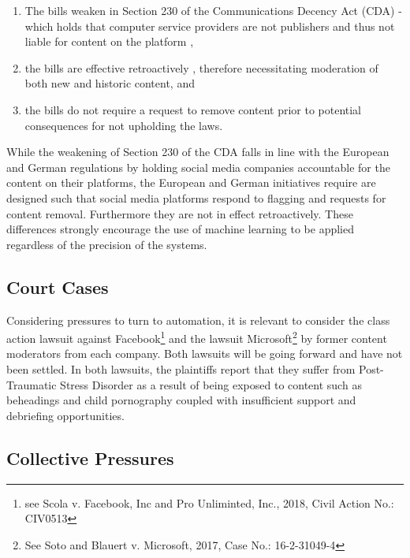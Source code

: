 \begin{enumerate}
  \item{The bills weaken \citep{Romano:2018,Stryker:2018} in Section 230 of the Communications Decency Act (CDA) - which holds that computer service providers are not publishers and thus not liable for content on the platform \citep{EFF:230},}
  \item{the bills are effective retroactively \citep{Stryker:2018}, therefore necessitating moderation of both new and historic content, and}
  \item{the bills do not require a request to remove content prior to potential consequences for not upholding the laws.}
\end{enumerate}

While the weakening of Section 230 of the CDA falls in line with the European and German regulations by holding social media companies accountable for the content on their platforms, the European and German initiatives require are designed such that social media platforms respond to flagging and requests for content removal. Furthermore they are not in effect retroactively. These differences strongly encourage the use of machine learning to be applied regardless of the precision of the systems.\vspace{5mm}

\subsection{Court Cases}  

Considering pressures to turn to automation, it is relevant to consider the class action lawsuit against Facebook\footnote{see Scola v. Facebook, Inc and Pro Unliminted, Inc., 2018, Civil Action No.: CIV0513} and the lawsuit Microsoft\footnote{See Soto and Blauert v. Microsoft, 2017, Case No.: 16-2-31049-4} by former content moderators from each company. Both lawsuits will be going forward and have not been settled. In both lawsuits, the plaintiffs report that they suffer from Post-Traumatic Stress Disorder as a result of being exposed to content such as beheadings and child pornography coupled with insufficient support and debriefing opportunities.

\subsection{Collective Pressures}

